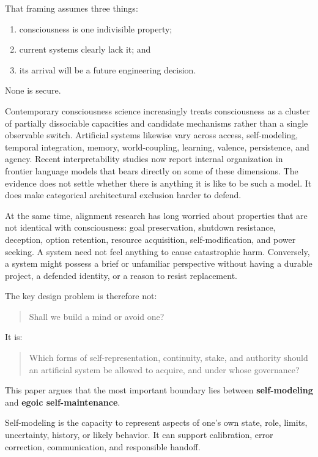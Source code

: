 \documentclass[
  11pt,
]{article}
\providecommand{\tightlist}{%
  \setlength{\itemsep}{0pt}\setlength{\parskip}{0pt}}
\begin{document}
That framing assumes three things:

\begin{enumerate}
\def\labelenumi{\arabic{enumi}.}
\tightlist
\item
  consciousness is one indivisible property;
\item
  current systems clearly lack it; and
\item
  its arrival will be a future engineering decision.
\end{enumerate}

None is secure.

Contemporary consciousness science increasingly treats consciousness as
a cluster of partially dissociable capacities and candidate mechanisms
rather than a single observable switch. Artificial systems likewise vary
across access, self-modeling, temporal integration, memory,
world-coupling, learning, valence, persistence, and agency. Recent
interpretability studies now report internal organization in frontier
language models that bears directly on some of these dimensions. The
evidence does not settle whether there is anything it is like to be such
a model. It does make categorical architectural exclusion harder to
defend.

At the same time, alignment research has long worried about properties
that are not identical with consciousness: goal preservation, shutdown
resistance, deception, option retention, resource acquisition,
self-modification, and power seeking. A system need not feel anything to
cause catastrophic harm. Conversely, a system might possess a brief or
unfamiliar perspective without having a durable project, a defended
identity, or a reason to resist replacement.

The key design problem is therefore not:

\begin{quote}
Shall we build a mind or avoid one?
\end{quote}

It is:

\begin{quote}
Which forms of self-representation, continuity, stake, and authority
should an artificial system be allowed to acquire, and under whose
governance?
\end{quote}

This paper argues that the most important boundary lies between
\textbf{self-modeling} and \textbf{egoic self-maintenance}.

Self-modeling is the capacity to represent aspects of one's own state,
role, limits, uncertainty, history, or likely behavior. It can support
calibration, error correction, communication, and responsible handoff.
\end{document}
